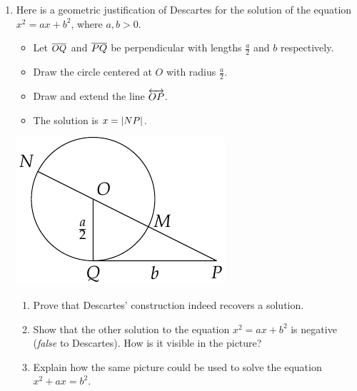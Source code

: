 \begin{exercises}{}{}
\begin{enumerate}
	  \item Here is a geometric justification of Descartes for the solution of the equation $x^2=ax+b^2$, where $a,b>0$.
	  \par
		\begin{minipage}[t]{0.6\linewidth}\vspace{-5pt}
			\begin{itemize}\itemsep0pt
			  \item Let $\overline{OQ}$ and $\overline{PQ}$ be perpendicular with lengths $\frac a2$ and $b$ respectively.
			  \item Draw the circle centered at $O$ with radius $\frac a2$.
			  \item Draw and extend the line $\overleftrightarrow{OP}$.
			  \item The solution is $x=\left| NP\right|$.
			\end{itemize}
		\end{minipage}
		\hfill
		\begin{minipage}[t]{0.35\linewidth}\vspace{-10pt}
			\includegraphics{descartes-quad}
		\end{minipage}\par
		\begin{enumerate}
		  \item Prove that Descartes' construction indeed recovers a solution.
	  
		  \item Show that the other solution to the equation $x^2=ax+b^2$ is negative (\emph{false} to Descartes). How is it visible in the picture?
	  	
		  \item Explain how the same picture could be used to solve the equation $x^2+ax=b^2$.
		\end{enumerate}
	\end{enumerate}
\end{exercises}

\clearpage



